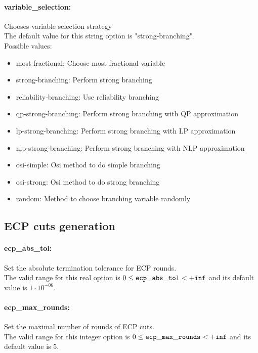 \paragraph{variable\_selection:}\label{opt:variable_selection} Chooses variable selection strategy \\
The default value for this string option is "strong-branching".
\\ 
Possible values:
\begin{itemize}
   \item most-fractional: Choose most fractional variable
   \item strong-branching: Perform strong branching
   \item reliability-branching: Use reliability branching
   \item qp-strong-branching: Perform strong branching with QP approximation
   \item lp-strong-branching: Perform strong branching with LP approximation
   \item nlp-strong-branching: Perform strong branching with NLP approximation
   \item osi-simple: Osi method to do simple branching
   \item osi-strong: Osi method to do strong branching
   \item random: Method to choose branching variable randomly
\end{itemize}

\subsection{ECP cuts generation}
\label{sec:ECPcutsgeneration}
\paragraph{ecp\_abs\_tol:}\label{opt:ecp_abs_tol} Set the absolute termination tolerance for ECP rounds. \\
 The valid range for this real option is 
$0 \le {\tt ecp\_abs\_tol } <  {\tt +inf}$
and its default value is $1 \cdot 10^{-06}$.


\paragraph{ecp\_max\_rounds:}\label{opt:ecp_max_rounds} Set the maximal number of rounds of ECP cuts. \\
 The valid range for this integer option is
$0 \le {\tt ecp\_max\_rounds } <  {\tt +inf}$
and its default value is $5$.


